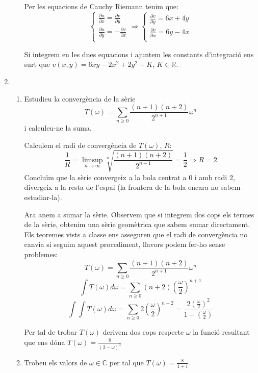 \documentclass[10pt,a4paper]{article}
\begin{document}
\begin{enumerate}
\begin{enumerate}
\begin{framed}
	Per les equacions de Cauchy Riemann tenim que:
	$$
	\begin{cases}
		\frac{\partial u}{\partial x} = \frac{\partial v}{\partial y} \\
		\frac{\partial u}{\partial y} = -\frac{\partial v}{\partial x} \\
	\end{cases} \Rightarrow
	\begin{cases}
		\frac{\partial v}{\partial y} = 6x + 4y \\
		\frac{\partial v}{\partial x} = 6y - 4x \\
	\end{cases}	
	$$
	
	Si integrem en les dues equacions i ajuntem les constants d'integració ens surt que $v(x,y) = 6xy - 2x^{2} + 2y^{2} + K$, $K\in\mathbb{R}$.		
	\end{framed}
		
	\end{enumerate}
\newpage
\item
	\begin{enumerate}	 
	\item Estudieu la convergència de la sèrie 
	$$T(\omega)=\sum_{n\geq 0}\frac{(n+1)(n+2)}{2^{n+1}}\omega^{n}$$
	i calculeu-ne la suma.

	\begin{framed}
	Calculem el radi de convergència de $T(\omega)$, $R$:
	$$\frac{1}{R} = \limsup_{n\rightarrow\infty}\sqrt[n]{\frac{(n+1)(n+2)}{2^{n+1}}} = \frac{1}{2} \Rightarrow R=2$$
	Concluïm que la sèrie convergeix a la bola centrat a 0 i amb radi 2, divergeix a la resta de l'espai (la frontera de la bola encara no sabem estudiar-la).
	
	Ara anem a sumar la sèrie. Observem que si integrem dos cops els termes de la sèrie, obtenim una sèrie geomètrica que sabem sumar directament. Els teoremes vists a classe ens asseguren que el radi de convergència no canvia si seguim aquest procediment, llavors podem fer-ho sense problemes:
	$$T(\omega) = \sum_{n\geq 0}\frac{(n+1)(n+2)}{2^{n+1}}\omega^{n}$$
	$$\int T(\omega) d\omega = \sum_{n\geq 0}(n+2)\left(\frac{\omega}{2}\right)^{n+1}$$
	$$\int \int T(\omega) d\omega = \sum_{n\geq 0}2\left(\frac{\omega}{2}\right)^{n+2} =
		\frac{2\left(\frac{\omega}{2}\right)^{2}}{1-\left(\frac{\omega}{2}\right)}$$

	Per tal de trobar $T(\omega)$ derivem dos cops respecte $\omega$ la funció resultant que ens dóna $T(\omega) = \frac{8}{(2-\omega)^{3}}$
	\end{framed}
	\item Trobeu els valors de $\omega\in\mathbb{C}$ per tal que $T(\omega)=\frac{8}{1+i}$.


\end{enumerate}
\end{enumerate}
\end{document}
